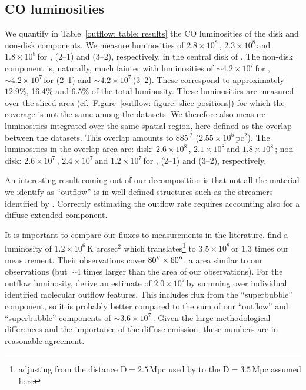 
\subsection{CO luminosities}

We quantify in Table~\ref{outflow: table: results} the CO luminosities of the disk and non-disk components. We measure luminosities of $2.8 \times 10^8$\,\Kkmspc, $2.3 \times 10^8$\,\Kkmspc and $1.8 \times 10^8$\,\Kkmspc for , (2--1) and (3--2), respectively, in the central disk of . The non-disk component is, naturally, much fainter with luminosities of $\sim 4.2 \times 10^7$\,\Kkmspc for , $\sim 4.2 \times 10^7$\,\Kkmspc for (2--1) and $\sim 4.2 \times 10^7$\,\Kkmspc (3--2). These correspond to approximately $12.9\%$, 16.4\% and 6.5\% of the total luminosity. These luminosities are measured over the sliced area (cf.\ Figure~\ref{outflow: figure: slice positions}) for which the coverage is not the same among the datasets. We therefore also measure luminosities integrated over the same spatial region, here defined as the overlap between the datasets. This overlap amounts to 885\,\arcsec$^2$ ($2.55\times10^5$\,pc$^2$). The luminosities in the overlap area are: disk: $2.6 \times 10^8$\,\Kkmspc, $2.1 \times 10^8$\,\Kkmspc and $1.8 \times 10^8$\,\Kkmspc; non-disk: $2.6 \times 10^7$\,\Kkmspc, $2.4 \times 10^7$\,\Kkmspc and $1.2 \times 10^7$\,\Kkmspc for , (2--1) and (3--2), respectively.

An interesting result coming out of our decomposition is that not all the material we identify as ``outflow'' is in well-defined structures such as the streamers identified by \citet{2013Natur.499..450B}. Correctly estimating the outflow rate requires accounting also for a diffuse extended component. 

It is important to compare our fluxes to measurements in the literature. \citet{1996A&A...305..421M} find a  luminosity of $1.2 \times 10^6$\,K\,\kms\,arcsec$^2$ which translates\footnote{adjusting from the distance $\mathrm{D} = 2.5$\,Mpc used by \citeauthor{1996A&A...305..421M} to the $\mathrm{D} = 3.5$\,Mpc assumed here} to $3.5 \times 10^8$\,\Kkmspc or $1.3$ times our measurement. Their observations cover $80^{\prime\prime} \times 60^{\prime\prime}$,
a area similar to our  observations (but $\sim 4$ times larger than the area of our  observations). For the outflow  luminosity, \citet{2013Natur.499..450B} derive an estimate of $2.0 \times 10^7$\,\Kkmspc by summing over individual identified molecular outflow features. This includes flux from the ``superbubble'' component, so it is probably better compared to the sum of our ``outflow'' and ``superbubble'' components of $\sim3.6\times10^7$\,\Kkmspc. Given the large methodological differences and the importance of the diffuse emission, these numbers are in reasonable agreement. 


